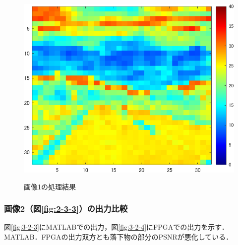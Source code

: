 \documentclass[paper]{ieicej}
\begin{document}
\begin{figure}[tb]
\begin{minipage}[]{0.32\linewidth}
    \label{fig:3-1-3}
  \end{minipage}
  \begin{minipage}[]{0.32\linewidth}
    \centering
    \includegraphics[width=0.9\columnwidth]{figures/Ex_re2.png}
    \label{fig:3-1-4}
  \end{minipage}
  \caption{画像1の処理結果}
  \label{fig:3-1-1}
\end{figure}

\subsubsection{画像2（図\ref{fig:2-3-3}）の出力比較}
図\ref{fig:3-2-3}にMATLABでの出力，図\ref{fig:3-2-4}にFPGAでの出力を示す．
MATLAB．FPGAの出力双方とも落下物の部分のPSNRが悪化している．
\end{document}
